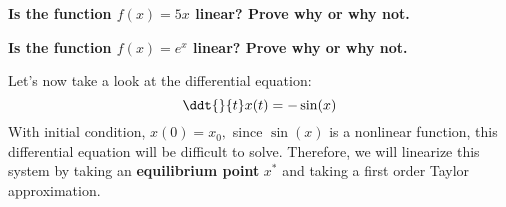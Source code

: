 \begin{enumerate}
  \qitem \textbf{Is the function $f(x) = 5x$ linear? Prove why or why not.}

  \ws {
    \vspace{75px}
  }

  \qitem \textbf{Is the function $f(x) = e^{x}$ linear? Prove why or why not.}

  \ws {
    \vspace{75px}
  }

\end{enumerate}

Let's now take a look at the differential equation:
\begin{equation} \label{eqn:nl}
  \ddt{}{t} x(t) = - \sin(x)
\end{equation}
With initial condition, $x(0) = x_{0},$ since $\sin(x)$ is a nonlinear function, this differential equation will be difficult to solve.
Therefore, we will linearize this system by taking an \textbf{equilibrium point} $x^{*}$ and taking a first order Taylor approximation.

